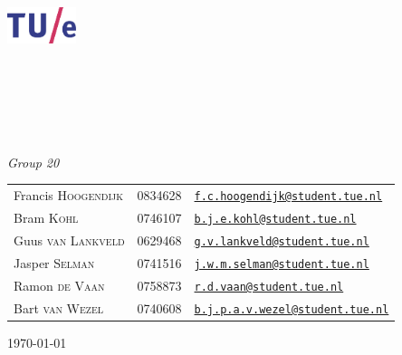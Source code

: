 \begin{titlepage}
	\begin{center}

		\includegraphics[width=0.15\textwidth]{Images/tuelogo}\\[1cm]

		\textsc{\LARGE \uni}\\[0.2cm]

		\textsc{\fase}\\[1.6cm]

        \textsc{\LARGE \vak}\\[0.5cm]

\HRule \\[0.4cm]
{ \huge \bfseries \essaytitle}\\[0.4cm]

\HRule \\[1.5cm]

	\emph{Group 20}\\
    \begin{tabular}{l l l}
	Francis \textsc{Hoogendijk} & 0834628 & \href{mailto:f.c.hoogendijk@student.tue.nl}{\texttt{f.c.hoogendijk@student.tue.nl}}\\
	Bram \textsc{Kohl} & 0746107 & \href{mailto:b.j.e.kohl@student.tue.nl}{\texttt{b.j.e.kohl@student.tue.nl}}\\
	Guus \textsc{van Lankveld} & 0629468 & \href{mailto:g.v.lankveld@student.tue.nl}{\texttt{g.v.lankveld@student.tue.nl}}\\
	Jasper \textsc{Selman} & 0741516 & \href{mailto:j.w.m.selman@student.tue.nl}{\texttt{j.w.m.selman@student.tue.nl}}\\
	Ramon \textsc{de Vaan} & 0758873 & \href{mailto:r.d.vaan@student.tue.nl}{\texttt{r.d.vaan@student.tue.nl}}\\
	Bart \textsc{van Wezel} & 0740608 & \href{mailto:b.j.p.a.v.wezel@student.tue.nl}{\texttt{b.j.p.a.v.wezel@student.tue.nl}}
    \end{tabular}
		\vfill

		{\large \today} \\
		\stad

	\end{center}
\end{titlepage} 